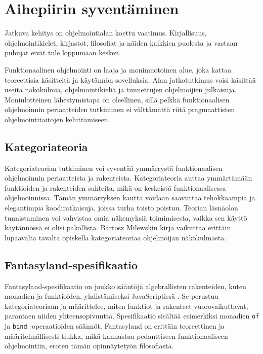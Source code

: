 \section{Aihepiirin syventäminen}

Jatkuva kehitys on ohjelmointialan koettu vaatimus. Kirjallisuus, ohjelmointikielet, kirjastot, filosofiat ja näiden kaikkien puolesta ja vastaan puhujat eivät tule loppumaan kesken.

Funktionaalinen ohjelmointi on laaja ja monimuotoinen alue, joka kattaa teoreettisia käsitteitä ja käytännön sovelluksia. Alan jatkotutkimus voisi käsittää useita näkökulmia, ohjelmointikieliä ja tunnettujen ohjelmoijien julkaisuja. Moniulotteinen lähestymistapa on oleellinen, sillä pelkkä funktionaalisen ohjelmoinnin periaatteiden tutkiminen ei välttämättä riitä pragmaattisten ohjelmointitaitojen kehittämiseen.

\subsection{Kategoriateoria}

Kategoriateorian tutkiminen voi syventää ymmärrystä funktionaalisen ohjelmoinnin periaatteista ja rakenteista. Kategoriateoria auttaa ymmärtämään funktioiden ja rakenteiden suhteita, mikä on keskeistä funktionaalisessa ohjelmoinnissa. Tämän ymmärryksen kautta voidaan saavuttaa tehokkaampia ja elegantimpia koodiratkaisuja, joissa turha toisto poistuu. Teorian läsnäolon tunnistaminen voi vahvistaa omia näkemyksiä toimimisesta, vaikka sen käyttö käytännössä ei olisi pakollista.
Bartosz Milewskin kirja  vaikuttaa erittäin lupaavalta tavalta opiskella kategoriateoriaa ohjelmoijan näkökulmasta.

\subsection{Fantasyland-spesifikaatio}

Fantasyland-spesifikaatio on joukko sääntöjä algebrallisten rakenteiden, kuten monadien ja funktioiden, yhdistämiseksi JavaScriptissä \cite{fantasy-land:contributors}. Se perustuu kategoriateoriaan ja määrittelee, miten funktiot ja rakenteet vuorovaikuttavat, parantaen niiden yhteensopivuutta. Spesifikaatio sisältää esimerkiksi monadien \texttt{of} ja \texttt{bind} -operaatioiden säännöt. Fantasyland on erittäin teoreettinen ja määritelmällisesti tiukka, mikä kannustaa pedanttiseen funktionaaliseen ohjelmointiin, eroten tämän opinnäytetyön filosofiasta.

